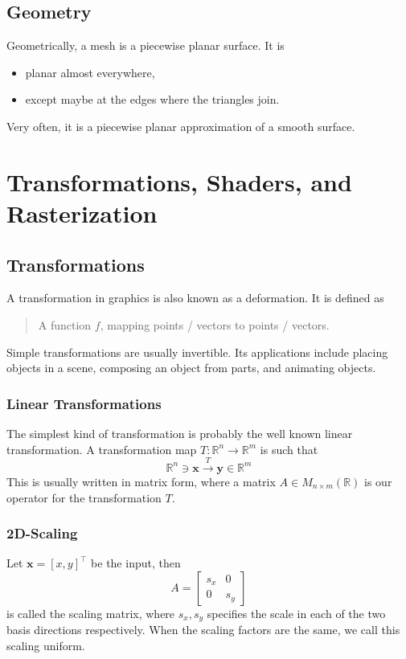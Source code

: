 \documentclass[11pt]{article}
\newcommand{\bx}{\mathbf{x}}
\newcommand{\by}{\mathbf{y}}
\newcommand{\R}{\mathbb{R}}
\newcommand{\real}{\mathbb{R}}
\newcommand{\mat}[2]{M_{#1 \times #2}(\R)}
\begin{document}
\subsection{Geometry}
Geometrically, a mesh is a piecewise planar surface. It is 
\begin{itemize}
	\item planar almost everywhere, 
	\item except maybe at the edges where the triangles join. 
\end{itemize}
Very often, it is a piecewise planar approximation of a smooth surface. 


\section{Transformations, Shaders, and Rasterization}
\subsection{Transformations}
A transformation in graphics is also known as a deformation. It is defined as
\begin{quotation}
	A function $f$, mapping points / vectors to points / vectors. 
\end{quotation}
Simple transformations are usually invertible. Its applications include placing objects in a scene, composing an object from parts, and animating objects. 

\subsubsection{Linear Transformations}
The simplest kind of transformation is probably the well known linear transformation. A transformation map $T: \real^n \rightarrow \real^m$ is such that 
\begin{equation}
	\real^n \ni \bx \overset{T}{\rightarrow} \by \in \real^m  
\end{equation}
This is usually written in matrix form, where a matrix $A\in\mat{n}{m}$ is our operator for the transformation $T$.

\subsubsection{2D-Scaling}
Let $\bx = [x, y]^\top$ be the input, then
\begin{equation}
	A = \begin{bmatrix}
		s_x & 0 \\ 
		0 & s_y
	\end{bmatrix}
\end{equation}
is called the scaling matrix, where $s_x, s_y$ specifies the scale in each of the two basis directions respectively. When the scaling factors are the same, we call this scaling uniform. 
\end{document}
